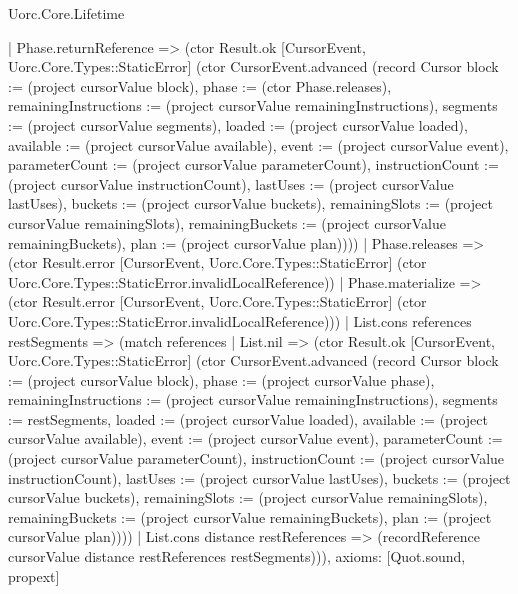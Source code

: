 \begin{lexlean}{Uorc.Core.Lifetime}
\begin{semanticmodule}
{      | Phase.returnReference => (ctor Result.ok [CursorEvent, Uorc.Core.Types::StaticError] (ctor CursorEvent.advanced (record Cursor {block := (project cursorValue block), phase := (ctor Phase.releases), remainingInstructions := (project cursorValue remainingInstructions), segments := (project cursorValue segments), loaded := (project cursorValue loaded), available := (project cursorValue available), event := (project cursorValue event), parameterCount := (project cursorValue parameterCount), instructionCount := (project cursorValue instructionCount), lastUses := (project cursorValue lastUses), buckets := (project cursorValue buckets), remainingSlots := (project cursorValue remainingSlots), remainingBuckets := (project cursorValue remainingBuckets), plan := (project cursorValue plan)})))
      | Phase.releases => (ctor Result.error [CursorEvent, Uorc.Core.Types::StaticError] (ctor Uorc.Core.Types::StaticError.invalidLocalReference))
      | Phase.materialize => (ctor Result.error [CursorEvent, Uorc.Core.Types::StaticError] (ctor Uorc.Core.Types::StaticError.invalidLocalReference)))
    | List.cons references restSegments => (match references
      | List.nil => (ctor Result.ok [CursorEvent, Uorc.Core.Types::StaticError] (ctor CursorEvent.advanced (record Cursor {block := (project cursorValue block), phase := (project cursorValue phase), remainingInstructions := (project cursorValue remainingInstructions), segments := restSegments, loaded := (project cursorValue loaded), available := (project cursorValue available), event := (project cursorValue event), parameterCount := (project cursorValue parameterCount), instructionCount := (project cursorValue instructionCount), lastUses := (project cursorValue lastUses), buckets := (project cursorValue buckets), remainingSlots := (project cursorValue remainingSlots), remainingBuckets := (project cursorValue remainingBuckets), plan := (project cursorValue plan)})))
      | List.cons distance restReferences => (recordReference cursorValue distance restReferences restSegments))),
  axioms: [Quot.sound, propext]
}


\end{semanticmodule}
\end{lexlean}
